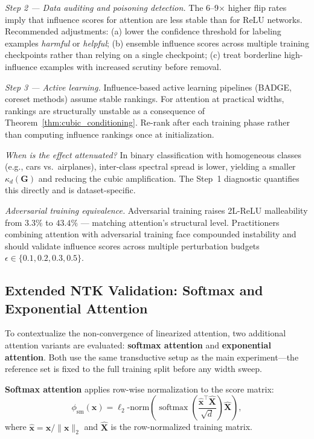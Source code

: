 \documentclass{article}
\theoremstyle{plain}
\theoremstyle{definition}
\theoremstyle{remark}
\begin{document}
\emph{Step 2 --- Data auditing and poisoning detection.} The 6--9$\times$ higher flip rates imply that influence scores for attention are less stable than for ReLU networks. Recommended adjustments: (a) lower the confidence threshold for labeling examples \emph{harmful} or \emph{helpful}; (b) ensemble influence scores across multiple training checkpoints rather than relying on a single checkpoint; (c) treat borderline high-influence examples with increased scrutiny before removal.

\emph{Step 3 --- Active learning.} Influence-based active learning pipelines (BADGE, coreset methods) assume stable rankings. For attention at practical widths, rankings are structurally unstable as a consequence of Theorem~\ref{thm:cubic_conditioning}. Re-rank after each training phase rather than computing influence rankings once at initialization.

\emph{When is the effect attenuated?} In binary classification with homogeneous classes (e.g., cars vs.\ airplanes), inter-class spectral spread is lower, yielding a smaller $\kappa_d(\mathbf{G})$ and reducing the cubic amplification. The Step~1 diagnostic quantifies this directly and is dataset-specific.

\emph{Adversarial training equivalence.} Adversarial training raises 2L-ReLU malleability from $3.3\%$ to $43.4\%$ --- matching attention's structural level. Practitioners combining attention with adversarial training face compounded instability and should validate influence scores across multiple perturbation budgets $\epsilon \in \{0.1, 0.2, 0.3, 0.5\}$.

\subsection{Extended NTK Validation: Softmax and Exponential Attention}
\label{app:softmax_ntk}

To contextualize the non-convergence of linearized attention, two additional attention variants are evaluated: \textbf{softmax attention} and \textbf{exponential attention}. Both use the same transductive setup as the main experiment---the reference set is fixed to the full training split before any width sweep.

\textbf{Softmax attention} applies row-wise normalization to the score matrix:
\begin{equation}
\phi_{\text{sm}}(\mathbf{x}) = \ell_2\text{-norm}\!\left(\operatorname{softmax}\!\left(\frac{\hat{\mathbf{x}}^\top \hat{\mathbf{X}}}{\sqrt{d}}\right)\hat{\mathbf{X}}\right),
\end{equation}
where $\hat{\mathbf{x}} = \mathbf{x}/\|\mathbf{x}\|_2$ and $\hat{\mathbf{X}}$ is the row-normalized training matrix.
\end{document}
